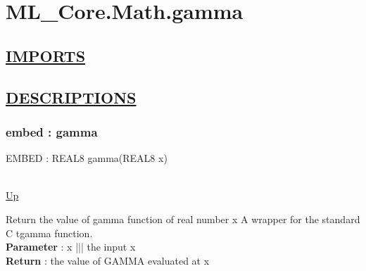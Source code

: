 \chapter*{ML\_Core.Math.gamma}
\hypertarget{ML_Core.Math.gamma}{}

\section*{\underline{IMPORTS}}

\section*{\underline{DESCRIPTIONS}}
\subsection*{embed : gamma}
\hypertarget{ecldoc:ml_core.math.gamma}{EMBED : REAL8 gamma(REAL8 x)} \\
\hyperlink{ecldoc:}{Up} \\
\par
Return the value of gamma function of real number x A wrapper for the standard C tgamma function. \\
\textbf{Parameter} : x ||| the input x \\
\textbf{Return} : the value of GAMMA evaluated at x \\
